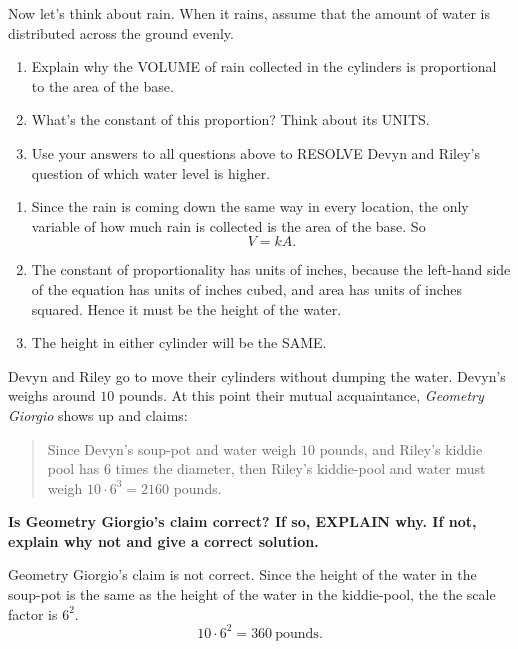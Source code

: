\documentclass[nooutcomes,noauthor,hints]{ximera}
\begin{document}
\begin{question}
  Now let's think about rain. When it rains, assume that the amount of
  water is distributed across the ground evenly.
  \begin{enumerate}
  \item Explain why the VOLUME of rain collected in the cylinders is
    proportional to the area of the base.
  \item What's the constant of this proportion? Think about its UNITS.
  \item Use your answers to all questions above to RESOLVE Devyn and
    Riley's question of which water level is higher.
  \end{enumerate}
  \begin{freeResponse}
    \begin{enumerate}
    \item Since the rain is coming down the same way in every
      location, the only variable of how much rain is collected is the
      area of the base. So
      \[
      V= k A.
      \]
    \item The constant of proportionality has units of inches, because
      the left-hand side of the equation has units of inches cubed,
      and area has units of inches squared. Hence it must be the height
      of the water.
    \item The height in either cylinder will be the SAME. 
    \end{enumerate}
  \end{freeResponse}
\end{question}
\mynewpage



\begin{question}
  Devyn and Riley go to move their cylinders without dumping the
  water. Devyn's weighs around $10$ pounds. At this point their mutual
  acquaintance, \textit{Geometry Giorgio} shows up and claims:
  \begin{quote}
    Since Devyn's soup-pot and water weigh $10$ pounds, and Riley's
    kiddie pool has $6$ times the diameter, then Riley's kiddie-pool
    and water must weigh $10\cdot 6^3 = 2160$ pounds.
  \end{quote}
  \textbf{Is Geometry Giorgio’s claim correct?  If so, EXPLAIN why. If
    not, explain why not and give a correct solution.}
  \begin{freeResponse}
    Geometry Giorgio’s claim is not correct. Since the height of the
    water in the soup-pot is the same as the height of the water in
    the kiddie-pool, the the scale factor is $6^2$.
    \[
    10\cdot 6^2=360~\text{pounds}.
    \]
  \end{freeResponse}
\end{question}
\end{document}
